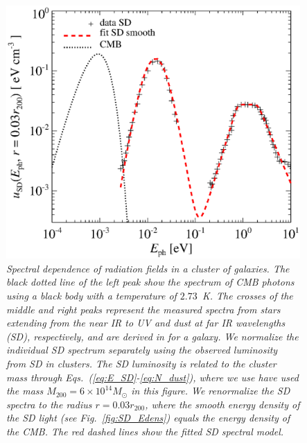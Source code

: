 \documentclass[10pt,aps,pra,reprint,amsmath,amsfonts,amssymb,showpacs,nofootinbib,floatfix]{revtex4-1}
\newcommand{\msun}{M_\odot}
\newcommand{\rvir}{r_{200}}
\newcommand{\mvir}{M_{200}}
\begin{document}
\begin{figure}%
 \includegraphics[width=0.99\columnwidth]{figures/fit.porter.v2.eps}
 \caption{\it Spectral dependence of radiation fields in a cluster of
   galaxies. The black dotted line of the left peak show the spectrum
   of CMB photons using a black body with a temperature of
   $2.73$~K. The crosses of the middle and right peaks represent the
   measured spectra from stars extending from the near IR to UV and
   dust at far IR wavelengths (SD), respectively, and are derived in
   \protect \cite{2006ApJ...648L..29P} for a galaxy. We normalize the
   individual SD spectrum separately using the observed luminosity
   from SD in clusters. The SD luminosity is related to the cluster
   mass through Eqs.~(\ref{eq:E_SD}-\ref{eq:N_dust}), where we use
   have used the mass $\mvir=6\times10^{14}\msun$ in this figure. We
   renormalize the SD spectra to the radius $r=0.03\rvir$, where the
   smooth energy density of the SD light (see Fig.~\ref{fig:SD_Edens})
   equals the energy density of the CMB. The red dashed lines show the
   fitted SD spectral model.}
 \label{fig:SD_spectra}
\end{figure}
\end{document}
